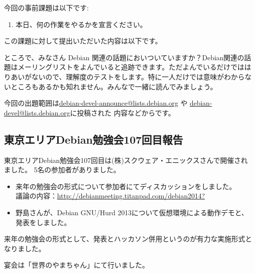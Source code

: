 \documentclass[mingoth,a4paper]{jsarticle}
\begin{document}

今回の事前課題は以下です:
\begin{enumerate}
 \item 本日、何の作業をやるかを宣言ください。
\end{enumerate}
この課題に対して提出いただいた内容は以下です。
\begin{multicols}{2}
{\small

}
\end{multicols}


ところで、みなさん Debian 関連の話題においついていますか？Debian関連の話
題はメーリングリストをよんでいると追跡できます。ただよんでいるだけではは
りあいがないので、理解度のテストをします。特に一人だけでは意味がわからな
いところもあるかも知れません。みんなで一緒に読んでみましょう。

今回の出題範囲は\url{debian-devel-announce@lists.debian.org} や \url{debian-devel@lists.debian.org}に投稿された
内容などからです。

\begin{multicols}{2}

\end{multicols}


\subsection{東京エリアDebian勉強会107回目報告}

 東京エリアDebian勉強会107回目は(株)スクウェア・エニックスさんで開催されました。
5名の参加者がありました。

\begin{itemize}
\item 来年の勉強会の形式について参加者にてディスカッションをしました。\\
議論の内容：\url{http://debianmeeting.titanpad.com/debian2014?}
\item 野島さんが、Debian GNU/Hurd 2013について仮想環境による動作デモと、発表をしました。
\end{itemize}

 来年の勉強会の形式として、発表とハッカソン併用というのが有力な実施形式となりました。

 宴会は「世界のやまちゃん」にて行いました。
 

\end{document}
